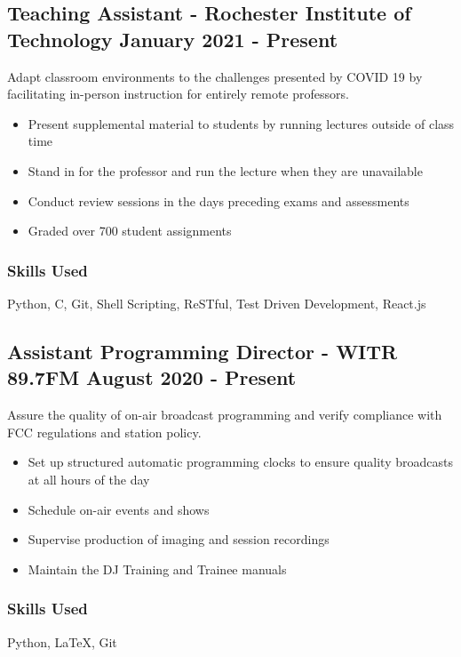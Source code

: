 \documentclass[11pt, letterpaper]{article}
\begin{document}
        \subsection{Teaching Assistant - Rochester Institute of Technology \hfill January 2021 - Present}
            Adapt classroom environments to the challenges presented by COVID 19 by facilitating in-person
            instruction for entirely remote professors.
            \begin{itemize}[nosep]
                \item Present supplemental material to students by running lectures outside of
                        class time
                \item Stand in for the professor and run the lecture when they are unavailable
                \item Conduct review sessions in the days preceding exams and assessments
                \item Graded over 700 student assignments
            \end{itemize}
            \subsubsection{Skills Used}
                Python, C, Git, Shell Scripting, ReSTful, Test Driven Development, React.js
        \subsection{Assistant Programming Director - WITR 89.7FM \hfill August 2020 - Present}
            Assure the quality of on-air broadcast programming and verify compliance with FCC
            regulations and station policy.
            \begin{itemize}[nosep]
                \item Set up structured automatic programming clocks to ensure quality broadcasts
                        at all hours of the day
                \item Schedule on-air events and shows
                \item Supervise production of imaging and session recordings
                \item Maintain the DJ Training and Trainee manuals
            \end{itemize}
            \subsubsection{Skills Used}
                Python, \LaTeX, Git
\end{document}
